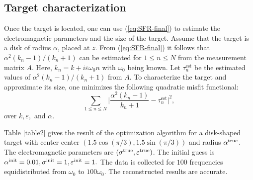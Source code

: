 \documentclass[final]{siamltex}
\numberwithin{equation}{section}
\numberwithin{figure}{section}
\numberwithin{table}{section}
\begin{document}







\subsection{Target characterization} \label{subsectcharcat}

Once the target is located, one can use (\ref{eq:SFR-final}) to
estimate the electromagnetic parameters and the size of the
target. Assume that the target is a disk of radius $\alpha$,
placed at $z$. From (\ref{eq:SFR-final}) it follows that
$\alpha^2(k_n-1)/(k_n+1)$ can be estimated for $ 1\leq n \leq N$
from the measurement matrix $A$. Here, $k_n = k+i\varepsilon
\omega_0 n$ with $\omega_0$ being known. Let $\tau_n^{\mbox
{est}}$ be the estimated values of $\alpha^2(k_n-1)/(k_n+1)$ from
$A$. To characterize the target and approximate its size, one
minimizes the following quadratic misfit functional:
\begin{equation} \label{minimiz1}
\sum_{1 \leq n\leq N} \bigg| \frac{\alpha^2(k_n-1)}{k_n+1} -
\tau_n^{\mbox {est}} \bigg|^2,
\end{equation}
over $k, \varepsilon,$ and $\alpha$.

Table \ref{table2} gives the result of the optimization algorithm
for a disk-shaped target with center center
$(1.5\cos(\pi/3),1.5\sin(\pi/3))$ and radius $\alpha^{{\rm
true}}$. The electromagnetic parameters are $(\sigma^{{\rm true}},
\varepsilon^{{\rm true}})$. The initial guess is $\alpha^{{\rm
init}} = 0.01, \sigma^{{\rm init}} = 1, \varepsilon^{{\rm init}}
=1.$ The data is collected for $100$ frequencies  equidistributed
from $\omega_0$ to $100 \omega_0$. The reconstructed results are
accurate.
\end{document}
